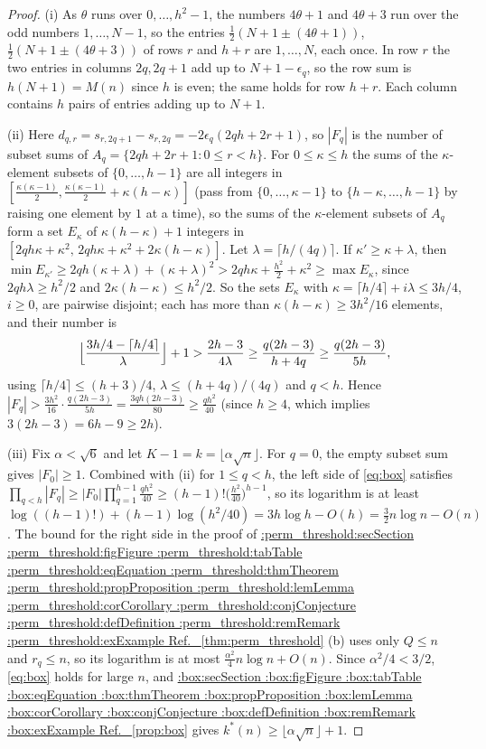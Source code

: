 \documentclass[11pt,a4paper]{article}
\makeatletter
\def\Cref@getprefix#1:#2\relax{#1}
\def\Cref@prefix@sec{sec}
\def\Cref@prefix@fig{fig}
\def\Cref@prefix@tab{tab}
\def\Cref@prefix@eq{eq}
\def\Cref@prefix@thm{thm}
\def\Cref@prefix@prop{prop}
\def\Cref@prefix@lem{lem}
\def\Cref@prefix@cor{cor}
\def\Cref@prefix@conj{conj}
\def\Cref@prefix@def{def}
\def\Cref@prefix@rem{rem}
\def\Cref@prefix@ex{ex}
\def\Cref@type@cap#1{%
  \edef\Cref@tmp{#1}%
  \ifx\Cref@tmp\Cref@prefix@sec Section%
  \else\ifx\Cref@tmp\Cref@prefix@fig Figure%
  \else\ifx\Cref@tmp\Cref@prefix@tab Table%
  \else\ifx\Cref@tmp\Cref@prefix@eq Equation%
  \else\ifx\Cref@tmp\Cref@prefix@thm Theorem%
  \else\ifx\Cref@tmp\Cref@prefix@prop Proposition%
  \else\ifx\Cref@tmp\Cref@prefix@lem Lemma%
  \else\ifx\Cref@tmp\Cref@prefix@cor Corollary%
  \else\ifx\Cref@tmp\Cref@prefix@conj Conjecture%
  \else\ifx\Cref@tmp\Cref@prefix@def Definition%
  \else\ifx\Cref@tmp\Cref@prefix@rem Remark%
  \else\ifx\Cref@tmp\Cref@prefix@ex Example%
  \else Ref.%
  \fi\fi\fi\fi\fi\fi\fi\fi\fi\fi\fi\fi
}
\DeclareRobustCommand{\Cref}[1]{%
  \begingroup
  \edef\Cref@label{#1}%
  \edef\Cref@prefix{\expandafter\Cref@getprefix\Cref@label:\relax}%
  \hyperref[#1]{\Cref@type@cap{\Cref@prefix}~\ref*{#1}}%
  \endgroup
}
\theoremstyle{plain}
\theoremstyle{definition}
\theoremstyle{remark}
\makeatother
\begin{document}
\begin{proof}
(i) As $\theta$ runs over $0,\dots,h^2-1$, the numbers $4\theta+1$ and $4\theta+3$ run over the odd numbers $1,\dots,N-1$, so the entries $\frac12(N+1\pm(4\theta+1))$, $\frac12(N+1\pm(4\theta+3))$ of rows $r$ and $h+r$ are $1,\dots,N$, each once.
In row $r$ the two entries in columns $2q,2q+1$ add up to $N+1-\epsilon_q$, so the row sum is $h(N+1)=M(n)$ since $h$ is even; the same holds for row $h+r$.
Each column contains $h$ pairs of entries adding up to $N+1$.

(ii) Here $d_{q,r}=s_{r,2q+1}-s_{r,2q}=-2\epsilon_q(2qh+2r+1)$, so $|F_q|$ is the number of subset sums of $A_q=\{2qh+2r+1:0\le r<h\}$.
For $0\le\kappa\le h$ the sums of the $\kappa$-element subsets of $\{0,\dots,h-1\}$ are all integers in $[\frac{\kappa(\kappa-1)}2,\frac{\kappa(\kappa-1)}2+\kappa(h-\kappa)]$ (pass from $\{0,\dots,\kappa-1\}$ to $\{h-\kappa,\dots,h-1\}$ by raising one element by $1$ at a time), so the sums of the $\kappa$-element subsets of $A_q$ form a set $E_\kappa$ of $\kappa(h-\kappa)+1$ integers in $[2qh\kappa+\kappa^2,\,2qh\kappa+\kappa^2+2\kappa(h-\kappa)]$.
Let $\lambda=\lceil h/(4q)\rceil$.
If $\kappa'\ge\kappa+\lambda$, then $\min E_{\kappa'}\ge2qh(\kappa+\lambda)+(\kappa+\lambda)^2>2qh\kappa+\frac{h^2}2+\kappa^2\ge\max E_\kappa$, since $2qh\lambda\ge h^2/2$ and $2\kappa(h-\kappa)\le h^2/2$.
So the sets $E_\kappa$ with $\kappa=\lceil h/4\rceil+i\lambda\le 3h/4$, $i\ge0$, are pairwise disjoint; each has more than $\kappa(h-\kappa)\ge3h^2/16$ elements, and their number is
\[
\Bigl\lfloor\frac{3h/4-\lceil h/4\rceil}{\lambda}\Bigr\rfloor+1>\frac{2h-3}{4\lambda}\ge\frac{q(2h-3)}{h+4q}\ge\frac{q(2h-3)}{5h},
\]
using $\lceil h/4\rceil\le(h+3)/4$, $\lambda\le(h+4q)/(4q)$ and $q<h$.
Hence $|F_q|>\frac{3h^2}{16}\cdot\frac{q(2h-3)}{5h}=\frac{3qh(2h-3)}{80}\ge\frac{qh^2}{40}$ (since $h\ge 4$, which implies $3(2h-3)=6h-9\ge 2h$).

(iii) Fix $\alpha<\sqrt6$ and let $K-1=k=\lfloor\alpha\sqrt n\rfloor$.
For $q=0$, the empty subset sum gives $|F_0|\ge 1$. Combined with (ii) for $1\le q<h$, the left side of \eqref{eq:box} satisfies $\prod_{q<h}|F_q|\ge |F_0|\prod_{q=1}^{h-1}\frac{qh^2}{40}\ge(h-1)!\bigl(\frac{h^2}{40}\bigr)^{h-1}$, so its logarithm is at least $\log((h-1)!)+(h-1)\log(h^2/40)=3h\log h-O(h)=\frac32n\log n-O(n)$.
The bound for the right side in the proof of \Cref{thm:perm_threshold}(b) uses only $Q\le n$ and $r_q\le n$, so its logarithm is at most $\frac{\alpha^2}4n\log n+O(n)$.
Since $\alpha^2/4<3/2$, \eqref{eq:box} holds for large $n$, and \Cref{prop:box} gives $k^*(n)\ge\lfloor\alpha\sqrt n\rfloor+1$.
\end{proof}
\end{document}
